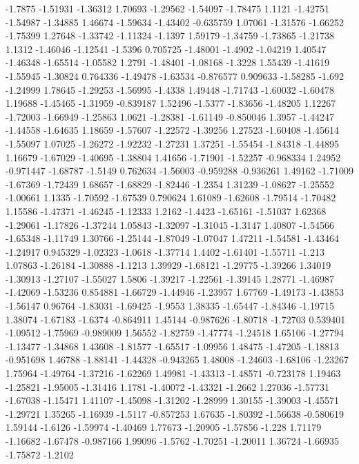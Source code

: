 \documentclass[9pt]{article}
\theoremstyle{plain}
\theoremstyle{definition}
\theoremstyle{remark}
\numberwithin{equation}{section}
\begin{document}
-1.7875
-1.51931
-1.36312
1.70693
-1.29562
-1.54097
-1.78475
1.1121
-1.42751
-1.54987
-1.34885
1.46674
-1.59634
-1.43402
-0.635759
1.07061
-1.31576
-1.66252
-1.75399
1.27648
-1.33742
-1.11324
-1.1397
1.59179
-1.34759
-1.73865
-1.21738
1.1312
-1.46046
-1.12541
-1.5396
0.705725
-1.48001
-1.4902
-1.04219
1.40547
-1.46348
-1.65514
-1.05582
1.2791
-1.48401
-1.08168
-1.3228
1.55439
-1.41619
-1.55945
-1.30824
0.764336
-1.49478
-1.63534
-0.876577
0.909633
-1.58285
-1.692
-1.24999
1.78645
-1.29253
-1.56995
-1.4338
1.49448
-1.71743
-1.60032
-1.60478
1.19688
-1.45465
-1.31959
-0.839187
1.52496
-1.5377
-1.83656
-1.48205
1.12267
-1.72003
-1.66949
-1.25863
1.0621
-1.28381
-1.61149
-0.850046
1.3957
-1.44247
-1.44558
-1.64635
1.18659
-1.57607
-1.22572
-1.39256
1.27523
-1.60408
-1.45614
-1.55097
1.07025
-1.26272
-1.92232
-1.27231
1.37251
-1.55454
-1.84318
-1.44895
1.16679
-1.67029
-1.40695
-1.38804
1.41656
-1.71901
-1.52257
-0.968334
1.24952
-0.971447
-1.68787
-1.5149
0.762634
-1.56003
-0.959288
-0.936261
1.49162
-1.71009
-1.67369
-1.72439
1.68657
-1.68829
-1.82446
-1.2354
1.31239
-1.08627
-1.25552
-1.00661
1.1335
-1.70592
-1.67539
0.790624
1.61089
-1.62608
-1.79514
-1.70482
1.15586
-1.47371
-1.46245
-1.12333
1.2162
-1.4423
-1.65161
-1.51037
1.62368
-1.29061
-1.17826
-1.37244
1.05843
-1.32097
-1.31045
-1.3147
1.40807
-1.54566
-1.65348
-1.11749
1.30766
-1.25144
-1.87049
-1.07047
1.47211
-1.54581
-1.43464
-1.24917
0.945329
-1.02323
-1.0618
-1.37714
1.4402
-1.61401
-1.55711
-1.213
1.07863
-1.26184
-1.30888
-1.1213
1.39929
-1.68121
-1.29775
-1.39266
1.34019
-1.30913
-1.27107
-1.55027
1.5806
-1.39217
-1.22561
-1.39145
1.28771
-1.46987
-1.42069
-1.53236
0.854881
-1.66729
-1.44946
-1.23957
1.67769
-1.49173
-1.43853
-1.56147
0.96764
-1.83031
-1.69425
-1.9553
1.38335
-1.65447
-1.84346
-1.19715
1.38074
-1.67183
-1.6374
-0.864911
1.45144
-0.987626
-1.80718
-1.72703
0.539401
-1.09512
-1.75969
-0.989009
1.56552
-1.82759
-1.47774
-1.24518
1.65106
-1.27794
-1.13477
-1.34868
1.43608
-1.81577
-1.65517
-1.09956
1.48475
-1.47205
-1.18813
-0.951698
1.46788
-1.88141
-1.44328
-0.943265
1.48008
-1.24603
-1.68106
-1.23267
1.75964
-1.49764
-1.37216
-1.62269
1.49981
-1.43313
-1.48571
-0.723178
1.19463
-1.25821
-1.95005
-1.31416
1.1781
-1.40072
-1.43321
-1.2662
1.27036
-1.57731
-1.67038
-1.15471
1.41107
-1.45098
-1.31202
-1.28999
1.30155
-1.39003
-1.45571
-1.29721
1.35265
-1.16939
-1.5117
-0.857253
1.67635
-1.80392
-1.56638
-0.580619
1.59144
-1.6126
-1.59974
-1.40469
1.77673
-1.20905
-1.57856
-1.228
1.71179
-1.16682
-1.67478
-0.987166
1.99096
-1.5762
-1.70251
-1.20011
1.36724
-1.66935
-1.75872
-1.2102
\end{document}
